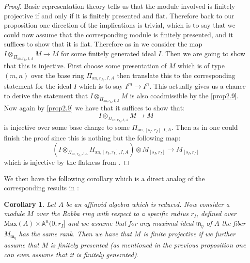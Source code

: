 \documentclass[12pt]{amsart}
\newtheorem{corollary}[theorem]{Corollary}
\theoremstyle{definition}
\numberwithin{equation}{section}
\begin{document}
\begin{proof}
Basic representation theory tells us that the module involved is finitely projective if and only if it is finitely presented and flat. Therefore back to our proposition one direction of the implications is trivial, which is to say that we could now assume that the corresponding module is finitely presented, and it suffices to show that it is flat. Therefore as in \cite[Lemma 2.1.6]{KPX} we consider the map $I\otimes_{\Pi_{\mathrm{an},r_{I_0},I,A}} M\rightarrow M$ for some finitely generated ideal $I$. Then we are going to show that this is injective. First choose some presentation of $M$ which is of type $(m,n)$ over the base ring $\Pi_{\mathrm{an},r_{I_0},I,A}$ then translate this to the corresponding statement for the ideal $I$ which is to say $I^m\rightarrow I^n$. This actually gives us a chance to derive the statement that $I\otimes_{\Pi_{\mathrm{an},r_{I_0},I,A}} M$ is also coadmissible by the \cref{prop2.9}. Now again by \cref{prop2.9} we have that it suffices to show that:
\begin{displaymath}
I\otimes_{\Pi_{\mathrm{an},r_{I_0},I,A}} M\rightarrow M	
\end{displaymath}
is injective over some base change to some $\Pi_{\mathrm{an},[s_I,r_I],I,A} $. Then as in \cite[Lemma 2.1.6]{KPX} one could finish the proof since this is nothing but the following map:
\begin{displaymath}
(I\otimes_{\Pi_{\mathrm{an},r_{I_0},I,A}} \Pi_{\mathrm{an},[s_I,r_I],I,A})\otimes  M_{[s_I,r_I]} \rightarrow M_{[s_I,r_I]}	
\end{displaymath}
which is injective by the flatness from \cite[Lemma 2.1.6]{KPX}.
\end{proof}




\indent We then have the following corollary which is a direct analog of the corresponding results in \cite[Corollary 2.1.7]{KPX}:

\begin{corollary}
Let $A$ be an affinoid algebra which is reduced. Now consider a module $M$ over the Robba ring with respect to a specific radius $r_I$, defined over $\mathrm{Max}(A)\times \mathbb{A}^n(0,r_I]$ and we assume that for any maximal ideal $\mathfrak{m}_\eta$ of $A$ the fiber $M_{\mathfrak{m}_\eta}$ has the same rank. Then we have that $M$ is finite projective if we further assume that $M$ is finitely presented (as mentioned in the previous proposition one can even assume that it is finitely generated).	
\end{corollary}
\end{document}
